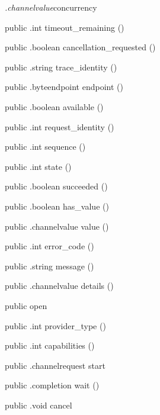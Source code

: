\begin{CrexxClass}{\textit{.channelvalue}}{concurrency}
\begin{Members}
    \Method
      {public}
      {.int}
      {timeout\_remaining}
      {()}

    \Method
      {public}
      {.boolean}
      {cancellation\_requested}
      {()}

    \Method
      {public}
      {.string}
      {trace\_identity}
      {()}

    \Method
      {public}
      {.byteendpoint}
      {endpoint}
      {()}

    \Method
      {public}
      {.boolean}
      {available}
      {()}

    \Method
      {public}
      {.int}
      {request\_identity}
      {()}

    \Method
      {public}
      {.int}
      {sequence}
      {()}

    \Method
      {public}
      {.int}
      {state}
      {()}

    \Method
      {public}
      {.boolean}
      {succeeded}
      {()}

    \Method
      {public}
      {.boolean}
      {has\_value}
      {()}

    \Method
      {public}
      {.channelvalue}
      {value}
      {()}

    \Method
      {public}
      {.int}
      {error\_code}
      {()}

    \Method
      {public}
      {.string}
      {message}
      {()}

    \Method
      {public}
      {.channelvalue}
      {details}
      {()}

    \Factory
      {public}
      {open}
      {}

    \Method
      {public}
      {.int}
      {provider\_type}
      {()}

    \Method
      {public}
      {.int}
      {capabilities}
      {()}

    \Method
      {public}
      {.channelrequest}
      {start}
      {}

    \Method
      {public}
      {.completion}
      {wait}
      {()}

    \Method
      {public}
      {.void}
      {cancel}
      {}


\end{Members}
\end{CrexxClass}

